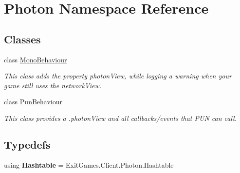 \hypertarget{namespace_photon}{}\section{Photon Namespace Reference}
\label{namespace_photon}
\subsection*{Classes}
\begin{DoxyCompactItemize}
\item 
class \hyperlink{class_photon_1_1_mono_behaviour}{Mono\+Behaviour}
\begin{DoxyCompactList}\small\item\em This class adds the property photon\+View, while logging a warning when your game still uses the network\+View. \end{DoxyCompactList}\item 
class \hyperlink{class_photon_1_1_pun_behaviour}{Pun\+Behaviour}
\begin{DoxyCompactList}\small\item\em This class provides a .photon\+View and all callbacks/events that P\+UN can call. \end{DoxyCompactList}\end{DoxyCompactItemize}
\subsection*{Typedefs}
\begin{DoxyCompactItemize}
\item 
using {\bfseries Hashtable} = Exit\+Games.\+Client.\+Photon.\+Hashtable\hypertarget{namespace_photon_ac2f4b49a218ef814d00e31cd5f32bf4e}{}\label{namespace_photon_ac2f4b49a218ef814d00e31cd5f32bf4e}

\end{DoxyCompactItemize}
